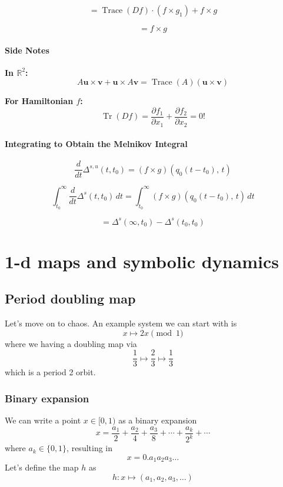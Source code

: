 \documentclass{article}
\begin{document}
\[
= \operatorname{Trace}(Df) \cdot (f \times g_1) + f \times g
\]

\[
= f \times g
\]

\paragraph{Side Notes}

\textbf{In $\mathbb{R}^2$:}
\[
A\mathbf{u} \times \mathbf{v} + \mathbf{u} \times A\mathbf{v} = \operatorname{Trace}(A)(\mathbf{u} \times \mathbf{v})
\]

\textbf{For Hamiltonian $f$:}
\[
\operatorname{Tr}(Df) = \frac{\partial f_1}{\partial x_1} + \frac{\partial f_2}{\partial x_2} = 0!
\]

\paragraph{Integrating to Obtain the Melnikov Integral}
\[
\frac{d}{dt} \Delta^{s,u}(t, t_0) = (f \times g)(q_0(t - t_0),\, t)
\]

\[
\int_{t_0}^{\infty} \frac{d}{dt} \Delta^s(t, t_0)\, dt 
= \int_{t_0}^{\infty} (f \times g)(q_0(t - t_0),\, t)\, dt
\]

\[
= \Delta^s(\infty, t_0) - \Delta^s(t_0, t_0)
\]

\section{1-d maps and symbolic dynamics}

\subsection{Period doubling map}

Let's move on to chaos. An example system we can start with is 
\[
x \mapsto 2x \pmod 1
\]
where we having a doubling map via 
\[
\frac{1}{3} \mapsto \frac{2}{3} \mapsto \frac{1}{3}
\]
which is a period 2 orbit.

\subsubsection{Binary expansion}

We can write a point $x\in[0,1)$ as a binary expansion 
\[
x=\frac{a_1}{2} + \frac{a_2}{4} + \frac{a_3}{8}+\cdots + \frac{a_k}{2^k} + \cdots 
\]
where $a_k\in\{0,1\}$, resulting in 
\[
x = 0.a_1a_2a_3\ldots
\]
Let's define the map $h$ as 
\[
h : x \mapsto \left(a_1, a_2, a_3, \ldots \right)
\]
\end{document}
